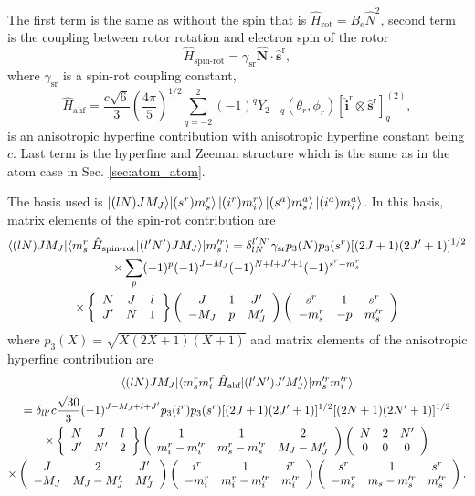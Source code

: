 \documentclass[a4paper]{article}
\newcommand{\threejm}[6]{ \left(\begin{array}{ccc} #1 & #3 & #5\\
    #2 & #4 & #6
\end{array}
\right)}
\newcommand{\sixj}[6]{ \left\{\begin{array}{ccc} #1 & #3 & #5\\
    #2 & #4 & #6
\end{array}
\right\}}
\begin{document}
    The first term is the same as without the spin that is \(\hat{H}_\text{rot} = B_e \hat{N}^2\),
    second term is the coupling between rotor rotation and electron spin of the rotor
    \begin{equation}
        \hat{H}_\text{spin-rot} =  \gamma_\text{sr} \hat{\mathbf{N}}\cdot \hat{\mathbf{s}}^\text{r},
    \end{equation}
    where \(\gamma_\text{sr}\) is a spin-rot coupling constant,
    \begin{equation}
        \hat{H}_\text{ahf} = \frac{c\sqrt{6}}{3} \left(\frac{4 \pi}{5}\right) ^ {1 / 2}
        \sum_{q=-2}^2 (-1)^qY_{2-q}(\theta_r,\phi_r) [\hat{\mathbf{i}}^\text{r} \otimes \hat{\mathbf{s}}^\text{r}]^{(2)}_q,
    \end{equation}
    is an anisotropic hyperfine contribution with anisotropic hyperfine constant being \(c\).
    Last term is the hyperfine and Zeeman structure which is the same as in the atom case in Sec. \ref{sec:atom_atom}.

    The basis used is \(\ket{(l N) J M_J} \! \ket{(s^r) m_s^r} \ket{(i^r) m_i^r} \ket{(s^a) m_s^a} \ket{(i^a) m_i^a}\).
    In this basis, matrix elements of the spin-rot contribution are
    \begin{multline}\label{eq:spin_rot_mel}
        \braket{(lN) J M_J |\langle m_s^r | \hat{H}_\text{spin-rot} | (l'N') J M_J \rangle| m_s'^r}
            = \delta_{lN}^{l'N'} \gamma_\text{sr} p_3(N)p_3(s^r) [(2J+1)(2J'+1)]^{1/2}
            \\ \times \sum_p (-1)^{p} (-1)^{J-M_J}(-1)^{N+l+J'+1} (-1)^{s^r - m_s^r}
            \\ \times \sixj{N}{J'}{J}{N}{l}{1} \threejm{J}{-M_J}{1}{p}{J'}{M_J'} \threejm{s^r}{-m_s^r}{1}{-p}{s^r}{m_s'^r} 
    \end{multline}
    where \(p_3(X) = \sqrt{X(2X + 1)(X + 1)}\) and 
    matrix elements of the anisotropic hyperfine contribution are
    \begin{multline}\label{eq:anisotropic_hifi_mel}
        \braket{(lN)J M_J |\langle m_s^r m_i^r | \hat{H}_\text{ahf} | (l'N') J'M'_J\rangle| m_s'^r m_i'^r} \\
            = \delta_{ll'} c\frac{\sqrt{30}}{3} (-1)^{J - M_J + l + J'}
            p_3(i^r) p_3(s^r) [(2J + 1)(2J' + 1)] ^ {1/2} [(2N + 1)(2N' + 1)] ^ {1/2} 
            \\ \times\sixj{N}{J'}{J}{N'}{l}{2}  
                \threejm{1}{m_i^r - m_i'^r}{1}{m_s^r - m_s'^r}{2}{M_J - M_J'} 
                \threejm{N}{0}{2}{0}{N'}{0} 
            \\ \times \threejm{J}{-M_J}{2}{M_J - M_J'}{J'}{M_J'}
            \threejm{i^r}{-m_i^r}{1}{m_i^r - m_i'^r}{i^r}{m_i'^r}
            \threejm{s^r}{-m_s^r}{1}{m_s - m_s'^r}{s^r}{m_s'^r}.
    \end{multline}
\end{document}
